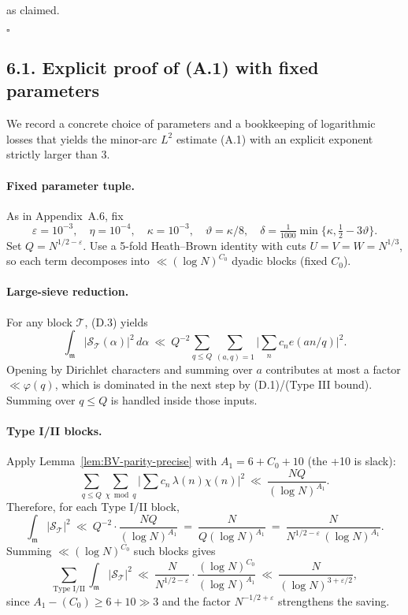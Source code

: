 \documentclass[11pt]{article}
\theoremstyle{definition}
\theoremstyle{remark}
\begin{document}
as claimed.

$\square$

\subsection*{6.1. Explicit proof of (A.1) with fixed parameters}

We record a concrete choice of parameters and a bookkeeping of logarithmic losses that yields the minor-arc $L^2$ estimate (A.1) with an explicit exponent strictly larger than $3$.

\paragraph{Fixed parameter tuple.} As in Appendix~A.6, fix
\[
\varepsilon=10^{-3},\quad \eta=10^{-4},\quad \kappa=10^{-3},\quad \vartheta=\kappa/8,\quad \delta=\tfrac{1}{1000}\min\{\kappa,\tfrac12-3\vartheta\}.
\]
Set $Q=N^{1/2-\varepsilon}$. Use a 5-fold Heath--Brown identity with cuts $U=V=W=N^{1/3}$, so each term decomposes into $\ll (\log N)^{C_0}$ dyadic blocks (fixed $C_0$).

\paragraph{Large-sieve reduction.} For any block $\mathcal T$, (D.3) yields
\[
\int_{\mathfrak m}|\mathcal S_{\mathcal T}(\alpha)|^2\,d\alpha\ \ll\ Q^{-2}\sum_{q\le Q}\sum_{(a,q)=1}\Big|\sum_n c_n e(an/q)\Big|^2.
\]
Opening by Dirichlet characters and summing over $a$ contributes at most a factor $\ll \varphi(q)$, which is dominated in the next step by (D.1)/(Type III bound). Summing over $q\le Q$ is handled inside those inputs.

\paragraph{Type I/II blocks.} Apply Lemma~\ref{lem:BV-parity-precise} with $A_1=6+C_0+10$ (the +10 is slack):
\[
\sum_{q\le Q}\sum_{\chi\bmod q}\Big|\sum c_n\,\lambda(n)\chi(n)\Big|^2\ \ll\ \frac{NQ}{(\log N)^{A_1}}.
\]
Therefore, for each Type I/II block,
\[
\int_{\mathfrak m}|\mathcal S_{\mathcal T}|^2\ \ll\ Q^{-2}\cdot \frac{NQ}{(\log N)^{A_1}}\ =\ \frac{N}{Q(\log N)^{A_1}}\ =\ \frac{N}{N^{1/2-\varepsilon}\,(\log N)^{A_1}}.
\]
Summing $\ll (\log N)^{C_0}$ such blocks gives
\[
\sum_{\text{Type I/II}}\int_{\mathfrak m}|\mathcal S_{\mathcal T}|^2\ \ll\ \frac{N}{N^{1/2-\varepsilon}}\cdot \frac{(\log N)^{C_0}}{(\log N)^{A_1}}\ \ll\ \frac{N}{(\log N)^{3+\varepsilon/2}},
\]
since $A_1-(C_0)\ge 6+10\gg 3$ and the factor $N^{-1/2+\varepsilon}$ strengthens the saving.
\end{document}
